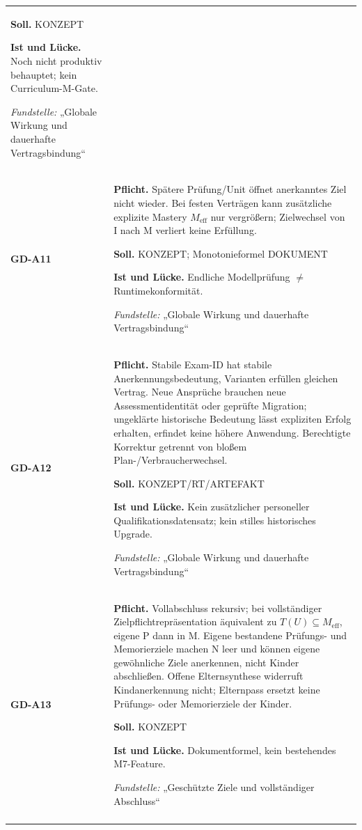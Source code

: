 \begin{longtable}{@{}P{20mm}P{128mm}@{}}
\textbf{Soll.} KONZEPT\par\smallskip
\textbf{Ist und Lücke.} Noch nicht produktiv behauptet; kein Curriculum-M-Gate.\par\smallskip
\emph{Fundstelle:} „Globale Wirkung und dauerhafte Vertragsbindung“\\\addlinespace[5pt]
\label{rule:GD-A11}\textbf{GD-A11} &
\textbf{Pflicht.} Spätere Prüfung/Unit öffnet anerkanntes Ziel nicht wieder. Bei festen Verträgen kann zusätzliche explizite Mastery \(M_{\mathrm{eff}}\) nur vergrößern; Zielwechsel von I nach M verliert keine Erfüllung.\par\smallskip
\textbf{Soll.} KONZEPT; Monotonieformel DOKUMENT\par\smallskip
\textbf{Ist und Lücke.} Endliche Modellprüfung \ensuremath{\neq} Runtimekonformität.\par\smallskip
\emph{Fundstelle:} „Globale Wirkung und dauerhafte Vertragsbindung“\\\addlinespace[5pt]
\label{rule:GD-A12}\textbf{GD-A12} &
\textbf{Pflicht.} Stabile Exam-ID hat stabile Anerkennungsbedeutung, Varianten erfüllen gleichen Vertrag. Neue Ansprüche brauchen neue Assessmentidentität oder geprüfte Migration; ungeklärte historische Bedeutung lässt expliziten Erfolg erhalten, erfindet keine höhere Anwendung. Berechtigte Korrektur getrennt von bloßem Plan-/Verbraucherwechsel.\par\smallskip
\textbf{Soll.} KONZEPT/RT/ARTEFAKT\par\smallskip
\textbf{Ist und Lücke.} Kein zusätzlicher personeller Qualifikationsdatensatz; kein stilles historisches Upgrade.\par\smallskip
\emph{Fundstelle:} „Globale Wirkung und dauerhafte Vertragsbindung“\\\addlinespace[5pt]
\label{rule:GD-A13}\textbf{GD-A13} &
\textbf{Pflicht.} Vollabschluss rekursiv; bei vollständiger Zielpflichtrepräsentation äquivalent zu \(T(U)\subseteq M_{\mathrm{eff}}\), eigene P dann in M. Eigene bestandene Prüfungs- und Memorierziele machen N leer und können eigene gewöhnliche Ziele anerkennen, nicht Kinder abschließen. Offene Elternsynthese widerruft Kindanerkennung nicht; Elternpass ersetzt keine Prüfungs- oder Memorierziele der Kinder.\par\smallskip
\textbf{Soll.} KONZEPT\par\smallskip
\textbf{Ist und Lücke.} Dokumentformel, kein bestehendes M7-Feature.\par\smallskip
\emph{Fundstelle:} „Geschützte Ziele und vollständiger Abschluss“\\\addlinespace[5pt]

\end{longtable}
